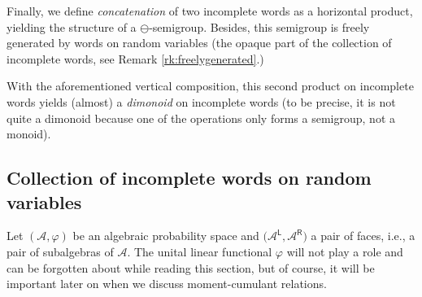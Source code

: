\documentclass[pdftex]{sigma}
\newcommand\LL{{\mathsf{L}}}
\newcommand\RR{{\mathsf{R}}}
\numberwithin{equation}{section}
\begin{document}
Finally, we define \emph{concatenation} of two incomplete words as a horizontal product, yielding the structure of a $\ominus$-semigroup. Besides, this semigroup is freely generated by words on random variables (the opaque part of the collection of incomplete words, see Remark \ref{rk:freelygenerated}.)

With the aforementioned vertical composition, this second product on incomplete words yields (almost) a \emph{dimonoid} on incomplete words (to be precise, it is not quite a dimonoid because one of the operations only forms a semigroup, not a monoid).

\subsection{Collection of incomplete words on random variables}

Let $(\mathcal A,\varphi)$ be an algebraic probability space and $\big(\mathcal A^\LL, \mathcal A^\RR\big)$ a pair of faces, i.e., a pair of subalgebras of $\mathcal A$.
The unital linear functional $\varphi$ will not play a role and can be forgotten about while reading this section, but of course, it will be important later on when we discuss moment-cumulant relations.

\newcommand\bulletAccent[1]{\accentset{\bullet}{#1}}
\end{document}
